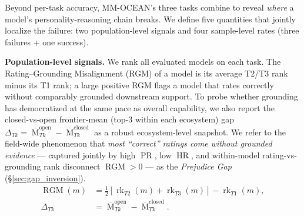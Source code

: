 \documentclass{article}
\newcommand{\benchname}{MM-OCEAN}
\newcommand{\gapname}{Rating--Grounding Misalignment}
\newcommand{\gapinv}{Prejudice Gap}
\begin{document}
Beyond per-task accuracy, \benchname{}'s three tasks combine to reveal \emph{where} a model's personality-reasoning chain breaks. We define five quantities that jointly localize the failure: two population-level signals and four sample-level rates (three failures + one success).

\noindent\textbf{Population-level signals.} We rank all evaluated models on each task. The \gapname{} (RGM) of a model is its average T2/T3 rank minus its T1 rank; a large positive RGM flags a model that rates correctly without comparably grounded downstream support. To probe whether grounding has democratized at the same pace as overall capability, we also report the closed-vs-open frontier-mean (top-3 within each ecosystem) gap $\Delta_{Tk}\!=\!\overline{\operatorname{M}}_{Tk}^{\text{open}}\!-\!\overline{\operatorname{M}}_{Tk}^{\text{closed}}$ as a robust ecosystem-level snapshot. We refer to the field-wide phenomenon that \emph{most ``correct'' ratings come without grounded evidence} --- captured jointly by high $\overline{\operatorname{PR}}$, low $\overline{\operatorname{HR}}$, and within-model rating-vs-grounding rank disconnect $\operatorname{RGM}\!>\!0$ --- as the \emph{\gapinv{}} (\S\ref{sec:gap_inversion}).
\begin{align}
\operatorname{RGM}(m) &= \tfrac{1}{2}\!\left[\operatorname{rk}_{T2}(m)+\operatorname{rk}_{T3}(m)\right] - \operatorname{rk}_{T1}(m), \label{eq:rgm}\\[-1pt]
\Delta_{Tk} &= \overline{\operatorname{M}}_{Tk}^{\text{open}} - \overline{\operatorname{M}}_{Tk}^{\text{closed}}. \label{eq:delta}
\end{align}
\vspace{-0.4cm}
\end{document}
